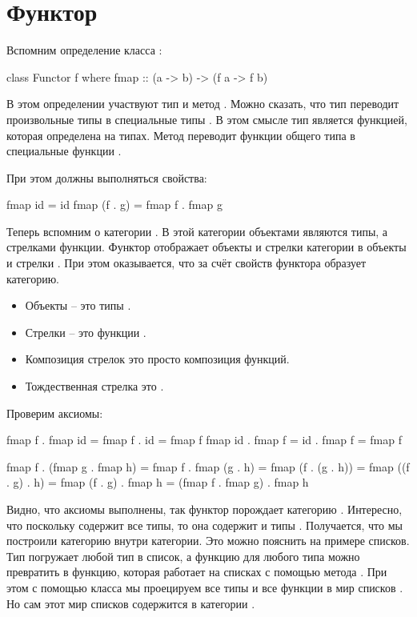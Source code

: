 \section{Функтор}

Вспомним определение класса :


\begin{code}
class Functor f where
    fmap :: (a -> b) -> (f a -> f b)
\end{code}

В этом определении участвуют тип  и метод . Можно
сказать, что тип  переводит произвольные типы  в специальные
типы . В этом смысле тип  является функцией, которая
определена на типах. Метод  переводит функции общего типа
 в специальные функции .

При этом должны выполняться свойства:


\begin{code}
fmap id  = id
fmap (f . g) = fmap f . fmap g
\end{code}

Теперь вспомним о категории . В этой категории объектами
являются типы, а стрелками функции. Функтор  отображает объекты и
стрелки категории  в объекты и стрелки . При этом
оказывается, что за счёт свойств функтора  образует
категорию.

\begin{itemize}
\item
  Объекты -- это типы .
\item
  Стрелки -- это функции .
\item
  Композиция стрелок это просто композиция функций.
\item
  Тождественная стрелка это .
\end{itemize}

Проверим аксиомы:


\begin{code}
fmap f . fmap id = fmap f . id = fmap f
fmap id . fmap f = id . fmap f = fmap f

    fmap f . (fmap g . fmap h) 
=   fmap f . fmap (g . h) 
=   fmap (f . (g . h))
=   fmap ((f . g) . h)
=   fmap (f . g) . fmap h
=   (fmap f . fmap g) . fmap h
\end{code}

Видно, что аксиомы выполнены, так функтор  порождает категорию
. Интересно, что поскольку  содержит все типы, то
она содержит и типы . Получается, что мы построили категорию
внутри категории. Это можно пояснить на примере списков. Тип \In{[]}
погружает любой тип в список, а функцию для любого типа можно превратить
в функцию, которая работает на списках с помощью метода . При
этом с помощью класса  мы проецируем все типы и все функции
в мир списков \In{[a]}. Но сам этот мир списков содержится в категории
.

